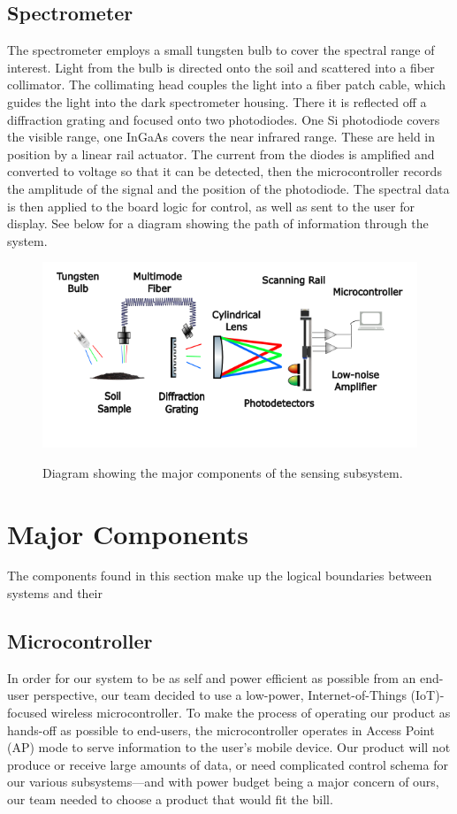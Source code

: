 \documentclass[journal]{IEEEtran}
\begin{document}
\subsection{Spectrometer} 
The spectrometer employs a small tungsten bulb to cover the spectral range of interest. Light from the bulb 
is directed onto the soil and scattered into a fiber collimator. The collimating head couples the light into 
a fiber patch cable, which guides the light into the dark spectrometer housing. There it is reflected off a 
diffraction grating and focused onto two photodiodes. One Si photodiode covers the visible range, one InGaAs 
covers the near infrared range. These are held in position by a linear rail actuator. The current from the 
diodes is amplified and converted to voltage so that it can be detected, then the microcontroller records the 
amplitude of the signal and the position of the photodiode. The spectral data is then applied to the board logic 
for control, as well as sent to the user for display. See below for a diagram showing the path of information 
through the system.
\begin{figure}[H]
    \centering
    \includegraphics[width=\linewidth]{images/Schematic Diagram 2.png}
    \label{fig:sensing-block}
    \caption{Diagram showing the major components of the sensing subsystem.}
\end{figure}
\section{Major Components} \label{sec:major-components}
The components found in this section make up the logical boundaries between systems and their
\subsection{Microcontroller}
In order for our system to be as self and power efficient as possible from an end-user perspective, our team decided to use a low-power, Internet-of-Things (IoT)-focused wireless microcontroller. To make the process of operating our product as hands-off as possible to end-users, the microcontroller operates in Access Point (AP) mode to serve information to the user's mobile device. Our product will not produce or receive large amounts of data, or need complicated control schema for our various subsystems---and with power budget being a major concern of ours, our team needed to choose a product that would fit the bill.
\end{document}
